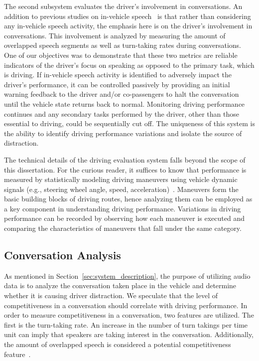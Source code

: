 The second subsystem evaluates the driver's involvement in conversations. 
An addition to previous studies on in-vehicle speech~\cite{ESPA} is that rather than considering any in-vehicle speech activity, the emphasis here is on the driver's involvement in conversations. 
This involvement is analyzed by measuring the amount of overlapped speech segments as well as turn-taking rates during conversations. 
One of our objectives was to demonstrate that these two metrics are reliable indicators of the driver's focus on speaking as opposed to the primary task, which is driving. 
If in-vehicle speech activity is identified to adversely impact the driver's performance, it can be controlled passively by providing an initial warning feedback to the driver and/or co-passengers to halt the conversation until the vehicle state returns back to normal. 
Monitoring driving performance continues and any secondary tasks performed by the driver, other than those essential to driving, could be sequentially cut off. 
The uniqueness of this system is the ability to identify driving performance variations and isolate the source of distraction. 

The technical details of the driving evaluation system falls beyond the scope of this dissertation. 
For the curious reader, it suffices to know that performance is measured by statistically modeling driving maneuvers using vehicle dynamic signals (e.g., steering wheel angle, speed, acceleration)~\cite{sathyanarayana2013belt}. 
Maneuvers form the basic building blocks of driving routes, hence analyzing them can be employed as a key component in understanding driving performance. 
Variations in driving performance can be recorded by observing how each maneuver is executed and comparing the characteristics of maneuvers that fall under the same category. 

\subsection{Conversation Analysis}
\label{sec:conversation_analysis}
As mentioned in Section~\ref{sec:system_description}, the purpose of utilizing audio data is to analyze the conversation taken place in the vehicle and determine whether it is causing driver distraction. 
We speculate that the level of competitiveness in a conversation should correlate with driving performance. 
In order to measure competitiveness in a conversation, two features are utilized. 
The first is the turn-taking rate. 
An increase in the number of turn takings per time unit can imply that speakers are taking interest in the conversation. 
Additionally, the amount of overlapped speech is considered a potential competitiveness feature~\cite{Schegloff}. 

